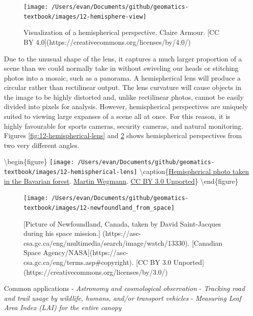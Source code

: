 \documentclass[
]{book}
\begin{document}
\begin{figure}
\texttt{[image: /Users/evan/Documents/github/geomatics-textbook/images/12-hemisphere-view]} \caption{Visualization of a hemispherical perspective. Claire Armour. [CC BY 4.0](https://creativecommons.org/licenses/by/4.0/)}\label{fig:12-hemisphere-view}
\end{figure}

Due to the unusual shape of the lens, it captures a much larger proportion of a scene than we could normally take in without swiveling our heads or stitching photos into a mosaic, such as a panorama. A hemispherical lens will produce a circular rather than rectilinear output. The lens curvature will cause objects in the image to be highly distorted and, unlike rectilinear photos, cannot be easily divided into pixels for analysis. However, hemispherical perspectives are uniquely suited to viewing large expanses of a scene all at once. For this reason, it is highly favourable for sports cameras, security cameras, and natural monitoring. Figures \ref{fig:12-hemispherical-lens} and \ref{fig:12-newfoundland-from-space} shows hemispherical perspectives from two very different angles.

\textbackslash begin\{figure\}
\texttt{[image: /Users/evan/Documents/github/geomatics-textbook/images/12-hemispherical-lens]} \textbackslash caption\{\href{https://en.wikipedia.org/wiki/File:Hemispherical_photo1.png}{Hemispherical photo taken in the Bavarian forest}. \href{https://commons.wikimedia.org/wiki/User:Wegmann}{Martin Wegmann}. \href{https://creativecommons.org/licenses/by/3.0/}{CC BY 3.0 Unported}\}\label{fig:12-hemispherical-lens}
\textbackslash end\{figure\}

\begin{figure}
\texttt{[image: /Users/evan/Documents/github/geomatics-textbook/images/12-newfoundland\_from\_space]} \caption{[Picture of Newfoundland, Canada, taken by David Saint-Jacques during his space mission.] (https://asc-csa.gc.ca/eng/multimedia/search/image/watch/13330). [Canadian Space Agency/NASA](https://asc-csa.gc.ca/eng/terms.asp#copyright). [CC BY 3.0 Unported](https://creativecommons.org/licenses/by/3.0/)}\label{fig:12-newfoundland-from-space}
\end{figure}

Common applications
- \emph{Astronomy and cosmological observation}
- \emph{Tracking road and trail usage by wildlife, humans, and/or transport vehicles}
- \emph{Measuring Leaf Area Index (LAI) for the entire canopy}
\end{document}
